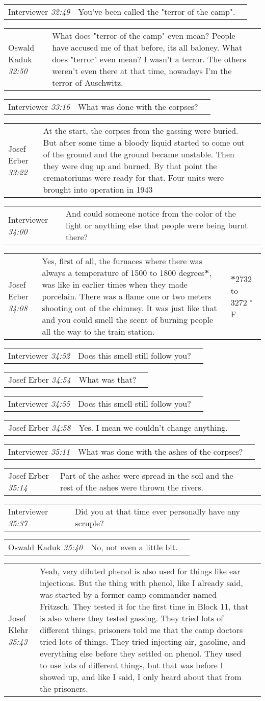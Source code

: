 \documentclass{article}
\newcommand{\I}{Interviewer}
\newcommand{\OK}{Oswald Kaduk}
\newcommand{\JE}{Josef Erber}
\newcommand{\JK}{Josef Klehr}
\newcommand{\dialogueentry}[4]{
    \begin{center}
    \begin{tabular}{p{1in} p{3.5in} p{1.5in}} 
        #2 \newline \textit{#1} & #3 & \small{#4} 
    \end{tabular}
    \end{center}
}
\newcommand{\seenote}[1]{\textbf{#1}}
\newcommand{\twolinebreak}{\newline \newline}
\begin{document}
\dialogueentry{32:49}{\I}{You've been called the "terror of the camp".}{}

\dialogueentry{32:50}{\OK}{What does "terror of the camp" even mean? People have accused me of that before, its all baloney. What does "terror" even mean? I wasn't a terror. The others weren't even there at that time, nowadays I'm the terror of Auschwitz.}{}

\dialogueentry{33:16}{\I}{What was done with the corpses?}{}

\dialogueentry{33:22}{\JE}{At the start, the corpses from the gassing were buried. But after some time a bloody liquid started to come out of the ground and the ground became unstable. Then they were dug up and burned.  By that point the crematoriums were ready for that. Four units were brought into operation in 1943}{}

\dialogueentry{34:00}{\I}{And could someone notice from the color of the light or anything else that people were being burnt there?}{}

\dialogueentry{34:08}{\JE}{Yes, first of all, the furnaces where there was always a temperature of 1500 to 1800 degrees\seenote{*}, was like in earlier times when they made porcelain. There was a flame one or two meters shooting out of the chimney. It was just like that and you could smell the scent of burning people all the way to the train station.}{\seenote{*}2732 to 3272 $^{\circ}$F}

\dialogueentry{34:52}{\I}{Does this smell still follow you?}{}

\dialogueentry{34:54}{\JE}{What was that?}{}

\dialogueentry{34:55}{\I}{Does this smell still follow you?}{}

\dialogueentry{34:58}{\JE}{Yes. I mean we couldn't change anything.}{}

\dialogueentry{35:11}{\I}{What was done with the ashes of the corpses?}{}

\dialogueentry{35:14}{\JE}{Part of the ashes were spread in the soil and the rest of the ashes were thrown the rivers.}{}

\dialogueentry{35:37}{\I}{Did you at that time ever personally have any scruple?}{}

\dialogueentry{35:40}{\OK}{No, not even a little bit.}{}

\dialogueentry{35:43}{\JK}{Yeah, very diluted phenol is also used for things like ear injections. But the thing with phenol, like I already said, was started by a former camp commander named Fritzsch.
\twolinebreak
They tested it for the first time in Block 11, that is also where they tested gassing. They tried lots of different things, prisoners told me that the camp doctors tried lots of things. They tried injecting air, gasoline, and everything else before they settled on phenol. They used to use lots of different things, but that was before I showed up, and like I said, I only heard about that from the prisoners.}{}
\end{document}
